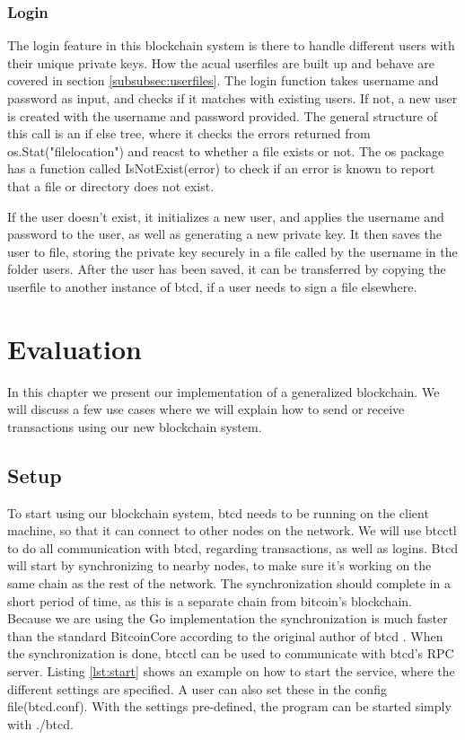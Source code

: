 \documentclass[12pt]{article}
\begin{document}
\subsubsection{Login}

The login feature in this blockchain system is there to handle different users with their unique private keys. How the acual userfiles are built up and behave are covered in section \ref{subsubsec:userfiles}. The login function takes username and password as input, and checks if it matches with existing users. If not, a new user is created with the username and password provided. The general structure of this call is an if else tree, where it checks the errors returned from os.Stat("filelocation") and reacst to whether a file exists or not. The os package has a function called IsNotExist(error) to check if an error is known to report that a file or directory does not exist. 

If the user doesn't exist, it initializes a new user, and applies the username and password to the user, as well as generating a new private key. It then saves the user to file, storing the private key securely in a file called by the username in the folder users. After the user has been saved, it can be transferred by copying the userfile to another instance of btcd, if a user needs to sign a file elsewhere. 

\section{Evaluation}

In this chapter we present our implementation of a generalized blockchain. We will discuss a few use cases where we will explain how to send or receive transactions using our new blockchain system. 

\subsection{Setup}
To start using our blockchain system, btcd needs to be running on the client machine, so that it can connect to other nodes on the network. We will use btcctl to do all communication with btcd, regarding transactions, as well as logins. Btcd will start by synchronizing to nearby nodes, to make sure it's working on the same chain as the rest of the network. The synchronization should complete in a short period of time, as this is a separate chain from bitcoin's blockchain. Because we are using the Go implementation the synchronization is much faster than the standard BitcoinCore according to the original author of btcd \cite{davec}. When the synchronization is done, btcctl can be used to communicate with btcd's RPC server. Listing \ref{lst:start} shows an example on how to start the service, where the different settings are specified. A user can also set these in the config file(btcd.conf). With the settings pre-defined, the program can be started simply with ./btcd.
\end{document}
